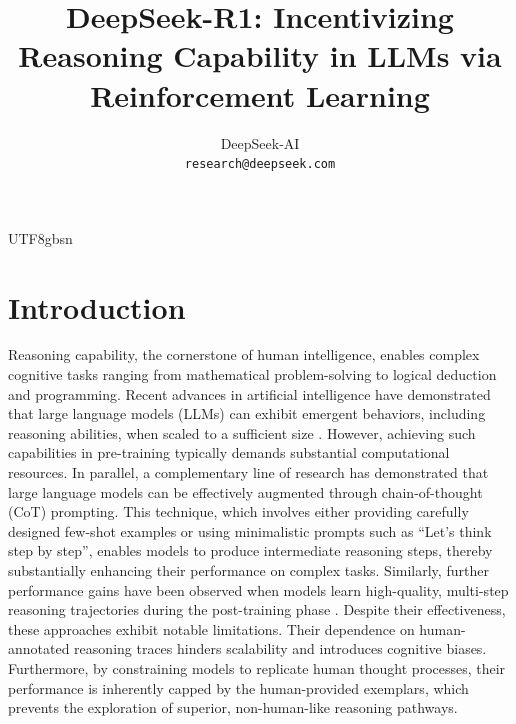 \documentclass[11pt, a4paper, logo, copyright, nonumbering]{deepseek}
\title{\centering DeepSeek-R1: Incentivizing Reasoning Capability in LLMs via Reinforcement Learning}
\author[*]{
DeepSeek-AI
\\
\small
\texttt{research@deepseek.com}
}
\begin{document}
\begin{CJK*}{UTF8}{gbsn}
\maketitle
{}

\section{Introduction}\label{sec1}
Reasoning capability, the cornerstone of human intelligence, enables complex cognitive tasks ranging from mathematical problem-solving to logical deduction and programming.  Recent advances in artificial intelligence have demonstrated that large language models (LLMs) can exhibit emergent behaviors, including reasoning abilities, when scaled to a sufficient size \citep{wei2022emergent, kaplan2020scaling}. However, achieving such capabilities in pre-training typically demands substantial computational resources.
 In parallel, a complementary line of research has demonstrated that large language models can be effectively augmented through chain-of-thought (CoT) prompting. This technique, which involves either providing carefully designed few-shot examples or using minimalistic prompts such as  “Let’s think step by step”\citep{wei2022chain,kojima2022large}, enables models to produce intermediate reasoning steps, thereby substantially enhancing their performance on complex tasks.
 Similarly, further performance gains have been observed when models learn high-quality, multi-step reasoning trajectories during the post-training phase \citep{gpt4,chung2024scaling}.
 Despite their effectiveness, these approaches exhibit notable limitations. Their dependence on human-annotated reasoning traces hinders scalability and introduces cognitive biases. Furthermore, by constraining models to replicate human thought processes, their performance is inherently capped by the human-provided exemplars, which prevents the exploration of superior, non-human-like reasoning pathways.


\end{CJK*}
\end{document}

